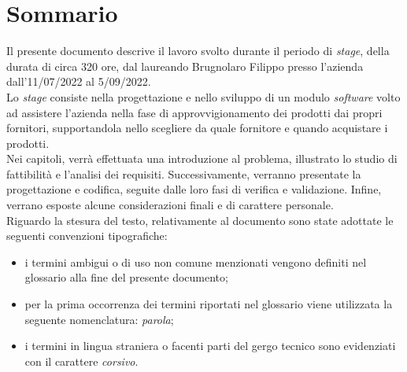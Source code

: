 
\cleardoublepage
{}
{}
\begingroup
\let\clearpage\relax
\let\cleardoublepage\relax
\let\cleardoublepage\relax

\chapter*{Sommario}

\noindent Il presente documento descrive il
lavoro svolto durante il periodo di \textit{stage},
della durata di circa 320 ore, dal laureando
Brugnolaro Filippo presso l'azienda
\textit{\myCompany} dall'11/07/2022 al
5/09/2022.\\
\noindent Lo \textit{stage} consiste nella progettazione e nello sviluppo di un modulo \textit{software} volto
ad assistere l'azienda nella fase di approvvigionamento dei prodotti dai propri fornitori, supportandola nello scegliere
da quale fornitore e quando acquistare i prodotti.\\
Nei capitoli, verrà effettuata una introduzione al problema, illustrato lo studio di fattibilità e l'analisi dei requisiti.
Successivamente, verranno presentate la progettazione e codifica, seguite dalle loro fasi di verifica e validazione.
Infine, verrano esposte alcune considerazioni finali e di carattere personale.\\
\noindent Riguardo la stesura del testo, relativamente al documento sono state adottate le seguenti convenzioni tipografiche:
\begin{itemize}
	\item i termini ambigui o di uso non comune menzionati vengono definiti nel glossario alla fine del presente documento;
	\item per la prima occorrenza dei termini riportati nel glossario viene utilizzata la seguente nomenclatura: \emph{parola}\glsfirstoccur;
	\item i termini in lingua straniera o facenti parti del gergo tecnico sono evidenziati con il carattere \emph{corsivo}.
\end{itemize}

%
%

\endgroup			

\vfill

